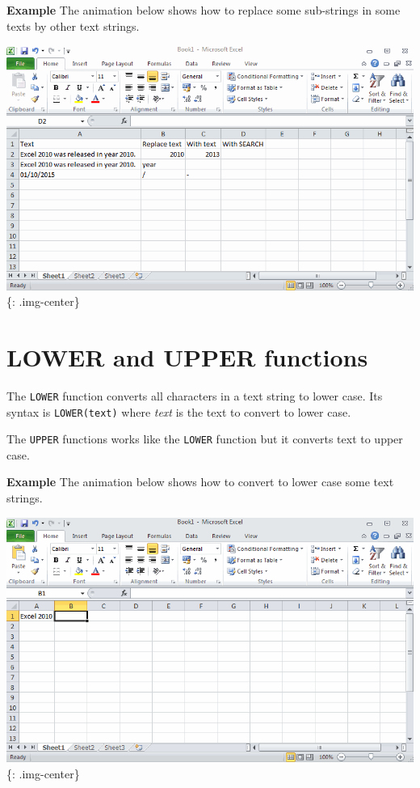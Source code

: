 \textbf{Example} The animation below shows how to replace some sub-strings in some texts by other text strings.

\includegraphics[keepaspectratio,width=\textwidth,height=0.75\textheight]{img/example_function_substitute.gif}
\{: .img-center\}

\section{LOWER and UPPER functions}
\label{lowerandupperfunctions}

The \texttt{LOWER} function converts all characters in a text string to lower case. Its syntax is \texttt{LOWER(text)} where \emph{text} is the text to convert to lower case.

The \texttt{UPPER} functions works like the \texttt{LOWER} function but it converts text to upper case. 

\textbf{Example} The animation below shows how to convert to lower case some text strings.

\includegraphics[keepaspectratio,width=\textwidth,height=0.75\textheight]{img/example_function_lower_upper.gif}
\{: .img-center\}

